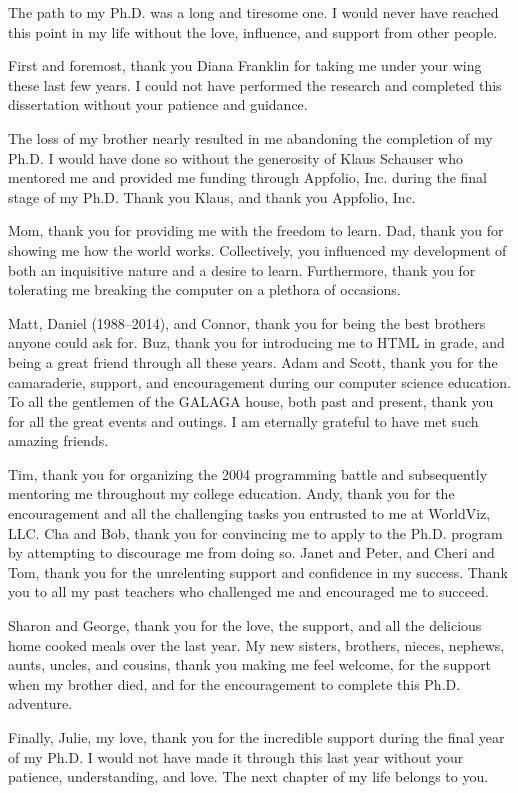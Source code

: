 \begin{acknowledgements}

The path to my Ph.D. was a long and tiresome one. I would never have reached
this point in my life without the love, influence, and support from other
people.

First and foremost, thank you Diana Franklin for taking me under your wing
these last few years. I could not have performed the research and completed
this dissertation without your patience and guidance.

The loss of my brother nearly resulted in me abandoning the completion of my
Ph.D. I would have done so without the generosity of Klaus Schauser who
mentored me and provided me funding through Appfolio, Inc. during the final
stage of my Ph.D. Thank you Klaus, and thank you Appfolio, Inc.

Mom, thank you for providing me with the freedom to learn. Dad, thank you for
showing me how the world works. Collectively, you influenced my development of
both an inquisitive nature and a desire to learn. Furthermore, thank you for
tolerating me breaking the computer on a plethora of occasions.

Matt, Daniel (1988--2014), and Connor, thank you for being the best brothers
anyone could ask for. Buz, thank you for introducing me to HTML in 
grade, and being a great friend through all these years. Adam and Scott, thank
you for the camaraderie, support, and encouragement during our computer science
education. To all the gentlemen of the GALAGA house, both past and present,
thank you for all the great events and outings. I am eternally grateful to have
met such amazing friends.

Tim, thank you for organizing the 2004 programming battle and subsequently
mentoring me throughout my college education. Andy, thank you for the
encouragement and all the challenging tasks you entrusted to me at WorldViz,
LLC. Cha and Bob, thank you for convincing me to apply to the Ph.D. program by
attempting to discourage me from doing so. Janet and Peter, and Cheri and Tom,
thank you for the unrelenting support and confidence in my success. Thank you
to all my past teachers who challenged me and encouraged me to succeed.

Sharon and George, thank you for the love, the support, and all the delicious
home cooked meals over the last year. My new sisters, brothers, nieces,
nephews, aunts, uncles, and cousins, thank you making me feel welcome, for the
support when my brother died, and for the encouragement to complete this
Ph.D. adventure.

Finally, Julie, my love, thank you for the incredible support during the final
year of my Ph.D. I would not have made it through this last year without your
patience, understanding, and love. The next chapter of my life belongs to you.

\end{acknowledgements}
